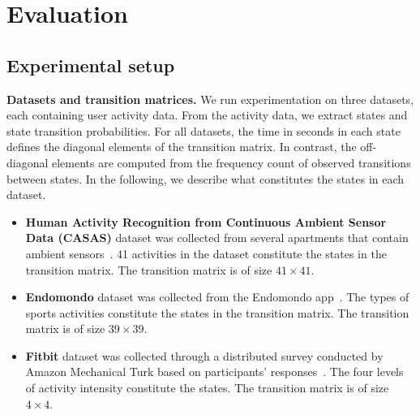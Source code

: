 \documentclass{article}
\begin{document}
\section{Evaluation}

\subsection{Experimental setup}



\textbf{Datasets and transition matrices.}
We run experimentation on three datasets, each containing user activity data. From the activity data, we extract states and state transition probabilities. For all datasets, the time in seconds in each state defines the diagonal elements of the transition matrix. In contrast, the off-diagonal elements are computed from the frequency count of observed transitions between states. In the following, we describe what constitutes the states in each dataset.  

\begin{itemize}%
    \item \textbf{Human Activity Recognition from Continuous Ambient Sensor Data (CASAS)} dataset was collected from several apartments that contain ambient sensors~\citep{casa_dataset}. 41 activities in the dataset constitute the states in the transition matrix. The transition matrix is of size $41\times41$. 
    \item \textbf{Endomondo} dataset was collected from the Endomondo app~\citep{fitRec}. The types of sports activities constitute the states in the transition matrix. The transition matrix is of size $39\times39$. 
    \item \textbf{Fitbit} dataset was collected through a distributed survey conducted by Amazon Mechanical Turk based on participants' responses~\citep{fitbit}. The four levels of activity intensity constitute the states. The transition matrix is of size $4\times4$.  

\end{itemize}
\end{document}

